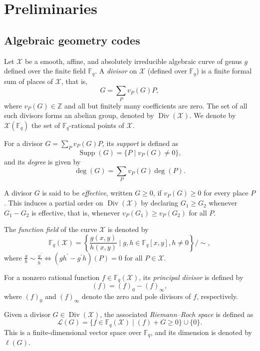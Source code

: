 \documentclass[sn-mathphys-num]{sn-jnl_modified}
\begin{document}
\section{Preliminaries}\label{sec:background}




\subsection{Algebraic geometry codes}

Let $\mathcal{X}$ be a smooth, affine, and absolutely irreducible algebraic curve of genus $g$ defined over the finite field $\mathbb{F}_{q}$. A \emph{divisor} on $\mathcal{X}$ (defined over $\mathbb{F}_{q}$) is a finite formal sum of places of $\mathcal{X}$, that is,
\[
G = \sum_{P} v_P(G)P,
\]
where $v_P(G) \in \mathbb{Z}$ and all but finitely many coefficients are zero. The set of all such divisors forms an abelian group, denoted by $\operatorname{Div}(\mathcal{X})$. We denote by $\mathcal{X}(\mathbb{F}_{q})$ the set of $\mathbb{F}_{q}$-rational points of $\mathcal{X}$.

For a divisor $G = \sum_P v_P(G)P$, its \emph{support} is defined as
\[
\operatorname{Supp}(G) = \{P \mid v_P(G) \neq 0\},
\]
and its \emph{degree} is given by
\[
\deg(G) = \sum_P v_P(G)\deg(P).
\]

A divisor $G$ is said to be \emph{effective}, written $G \geq 0$, if $v_P(G) \geq 0$ for every place $P$. This induces a partial order on $\operatorname{Div}(\mathcal{X})$ by declaring $G_1 \geq G_2$ whenever $G_1 - G_2$ is effective, that is, whenever $v_P(G_1) \geq v_P(G_2)$ for all $P$.


The \textit{function field} of the curve $\mathcal{X}$ is denoted by
\[
\mathbb{F}_{q}(\mathcal{X})=\left\{ \frac{g(x,y)}{h(x,y)} \mid g,h \in \mathbb{F}_{q}[x, y], h \neq 0 \right\}/\sim,
\]
where $\frac{g}{h} \sim \frac{g^\prime}{h^\prime} \Leftrightarrow (gh^\prime - g^\prime h)(P) = 0$ for all $P \in \mathcal{X}$. 

For a nonzero rational function $f \in \mathbb{F}_{q}(\mathcal{X})$, its \emph{principal divisor} is defined by
\[
(f) = (f)_0 - (f)_\infty,
\]
where $(f)_0$ and $(f)_\infty$ denote the zero and pole divisors of $f$, respectively.



Given a divisor $G \in \operatorname{Div}(\mathcal{X})$, the associated \emph{Riemann–Roch space} is defined as
\[
\mathscr{L}(G)
=
\{f \in \mathbb{F}_{q}(\mathcal{X}) \mid (f) + G \geq 0 \}
\cup \{0\}.
\]
This is a finite-dimensional vector space over $\mathbb{F}_{q}$, and its dimension is denoted by $\ell(G)$.
\end{document}
